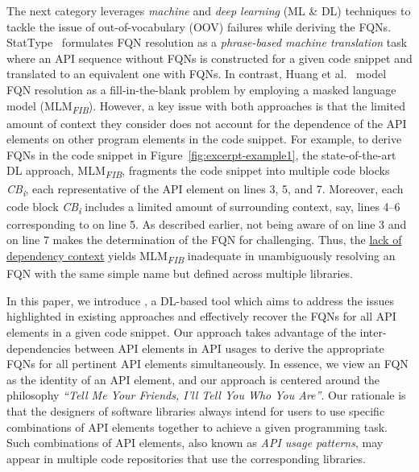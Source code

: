 The next category leverages {\em machine} and {\em deep learning} (ML \& DL) techniques to tackle the issue of out-of-vocabulary (OOV) failures while deriving the FQNs.
StatType~\cite{icse18} formulates FQN resolution as a {\em phrase-based machine translation} task where an API sequence without FQNs is constructed for a given code snippet and translated to an equivalent one with FQNs.
In contrast, Huang et al.~\cite{prompt-ase22} model FQN resolution as a fill-in-the-blank problem by employing a masked language model (MLM\textsubscript{\textit{FIB}}).
However, a key issue with both approaches is that the limited amount of context they consider does not account for the dependence of the API elements on other program elements in the code snippet. For example, to derive FQNs in the code snippet in Figure~\ref{fig:excerpt-example1}, the state-of-the-art DL approach, MLM\textsubscript{\textit{FIB}}, fragments the code snippet into multiple code blocks \textit{CB\textsubscript{i}}, each representative of the API element on lines 3, 5, and 7. Moreover, each code block \textit{CB\textsubscript{i}} includes a limited amount of surrounding context, say, lines 4--6 corresponding to  on line 5. As described earlier, not being aware of  on line 3 and  on line 7 makes the determination of the FQN for  challenging. Thus, the \underline{lack of dependency context} yields MLM\textsubscript{\textit{FIB}} inadequate in unambiguously resolving an FQN with the same simple name but defined across multiple libraries.

In this paper, we introduce {\tool}, a DL-based tool which aims to address the issues highlighted in existing approaches and effectively recover the FQNs for all API elements in a given code snippet. Our approach takes advantage of the inter-dependencies between API elements in API usages to derive the appropriate FQNs for all pertinent API elements simultaneously. In essence, we view an FQN as the identity of an API element, and our approach is centered around the philosophy {\em ``Tell Me Your Friends, I'll Tell You Who You Are''}. 
Our rationale is that the designers of software libraries always intend for users to use specific combinations of API elements together to achieve a given programming task. Such combinations of API elements, also known as {\em API usage patterns}, may appear in multiple code repositories that use the corresponding libraries.


